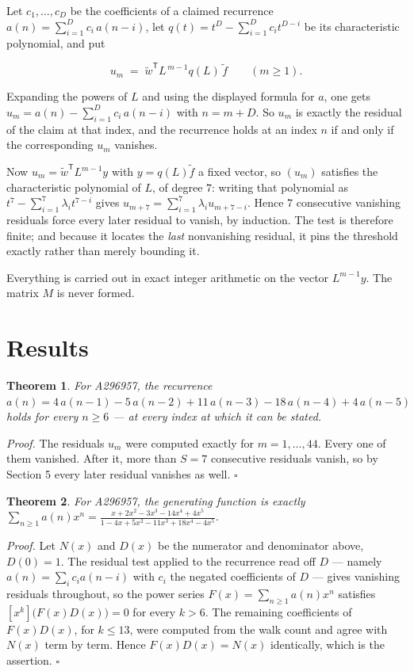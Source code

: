 \documentclass[11pt]{article}
\newtheorem{theorem}{Theorem}
\theoremstyle{definition}
\begin{document}
Let $c_1,\dots,c_D$ be the coefficients of a claimed recurrence $a(n) = \sum_{i=1}^{D} c_i\,a(n-i)$, let $q(t) = t^{D} - \sum_{i=1}^{D} c_i t^{D-i}$ be its characteristic polynomial, and put

\[u_m \;=\; \tilde w^{\mathsf T} L^{\,m-1} q(L)\,\tilde f \qquad (m \ge 1).\]

Expanding the powers of $L$ and using the displayed formula for $a$, one gets $u_m = a(n) - \sum_{i=1}^{D} c_i\,a(n-i)$ with $n = m + D$. So $u_m$ is exactly the residual of the claim at that index, and the recurrence holds at an index $n$ if and only if the corresponding $u_m$ vanishes.

Now $u_m = \tilde w^{\mathsf T} L^{m-1} y$ with $y = q(L)\tilde f$ a fixed vector, so $(u_m)$ satisfies the characteristic polynomial of $L$, of degree $7$: writing that polynomial as $t^{7} - \sum_{i=1}^{7} \lambda_i t^{7-i}$ gives $u_{m+7} = \sum_{i=1}^{7} \lambda_i u_{m+7-i}$. Hence $7$ consecutive vanishing residuals force every later residual to vanish, by induction. The test is therefore finite; and because it locates the {\itshape last} nonvanishing residual, it pins the threshold exactly rather than merely bounding it.

Everything is carried out in exact integer arithmetic on the vector $L^{m-1}y$. The matrix $M$ is never formed.

\section{Results}

\begin{theorem} For A296957, the recurrence $a(n) = 4\,a(n-1) - 5\,a(n-2) + 11\,a(n-3) - 18\,a(n-4) + 4\,a(n-5)$ holds for every $n \ge 6$ --- at every index at which it can be stated.\end{theorem}

{\itshape Proof.} The residuals $u_m$ were computed exactly for $m = 1,\dots,44$. Every one of them vanished. After it, more than $S = 7$ consecutive residuals vanish, so by Section 5 every later residual vanishes as well. $\square$

\begin{theorem} For A296957, the generating function is exactly $\sum_{n\ge 1} a(n)x^n = \frac{x + 2x^{2} - 3x^{3} - 14x^{4} + 4x^{5}}{1 - 4x + 5x^{2} - 11x^{3} + 18x^{4} - 4x^{5}}$.\end{theorem}

{\itshape Proof.} Let $N(x)$ and $D(x)$ be the numerator and denominator above, $D(0)=1$. The residual test applied to the recurrence read off $D$ --- namely $a(n) = \sum_i c_i a(n-i)$ with $c_i$ the negated coefficients of $D$ --- gives vanishing residuals throughout, so the power series $F(x)=\sum_{n\ge 1}a(n)x^n$ satisfies $[x^k]\bigl(F(x)D(x)\bigr) = 0$ for every $k > 6$. The remaining coefficients of $F(x)D(x)$, for $k \le 13$, were computed from the walk count and agree with $N(x)$ term by term. Hence $F(x)D(x) = N(x)$ identically, which is the assertion. $\square$
\end{document}
